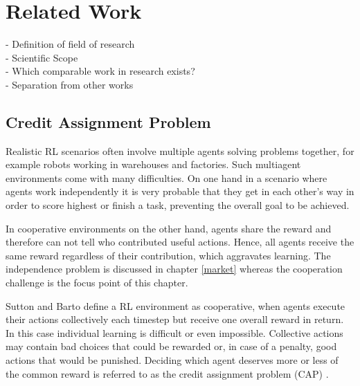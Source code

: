 %
%
\chapter{Related Work}\label{sec:RelatedWork}
- Definition of field of research \\
- Scientific Scope \\
- Which comparable work in research exists? \\
- Separation from other works

\section{Credit Assignment Problem}\label{CAP}
Realistic RL scenarios often involve multiple agents solving problems together, for example robots working in warehouses and factories. Such multiagent environments come with many difficulties. On one hand in a scenario where agents work independently it is very probable that they get in each other's way in order to score highest or finish a task, preventing the overall goal to be achieved.

In cooperative environments on the other hand, agents share the reward and therefore can not tell who contributed useful actions. Hence, all agents receive the same reward regardless of their contribution, which aggravates learning. The independence problem is discussed in chapter \ref{market} whereas the cooperation challenge is the focus point of this chapter.

Sutton and Barto \cite{suba18} define a RL environment as cooperative, when agents execute their actions collectively each timestep but receive one overall reward in return. In this case individual learning is difficult or even impossible. Collective actions may contain bad choices that could be rewarded or, in case of a penalty, good actions that would be punished. Deciding which agent deserves more or less of the common reward is referred to as the credit assignment problem (CAP) \cite{mi61}.

